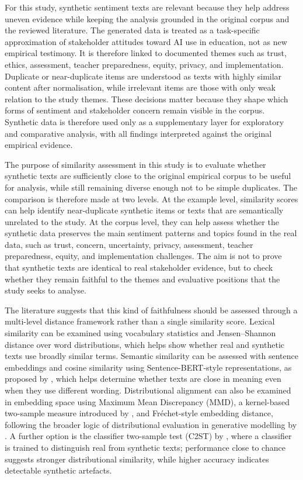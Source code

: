 For this study, synthetic sentiment texts are relevant because they help address
uneven evidence while keeping the analysis grounded in the original corpus and the
reviewed literature. The generated data is treated as a task-specific approximation
of stakeholder attitudes toward AI use in education, not as new empirical testimony.
It is therefore linked to documented themes such as trust, ethics, assessment,
teacher preparedness, equity, privacy, and implementation. Duplicate or
near-duplicate items are understood as texts with highly similar content after
normalisation, while irrelevant items are those with only weak relation to the study
themes. These decisions matter because they shape which forms of sentiment and
stakeholder concern remain visible in the corpus. Synthetic data is therefore used
only as a supplementary layer for exploratory and comparative analysis, with all
findings interpreted against the original empirical evidence.

The purpose of similarity assessment in this study is to evaluate whether synthetic
texts are sufficiently close to the original empirical corpus to be useful for
analysis, while still remaining diverse enough not to be simple duplicates. The
comparison is therefore made at two levels. At the example level, similarity scores
can help identify near-duplicate synthetic items or texts that are semantically
unrelated to the study. At the corpus level, they can help assess whether the
synthetic data preserves the main sentiment patterns and topics found in the real
data, such as trust, concern, uncertainty, privacy, assessment, teacher preparedness,
equity, and implementation challenges. The aim is not to prove that synthetic texts
are identical to real stakeholder evidence, but to check whether they remain faithful
to the themes and evaluative positions that the study seeks to analyse.

The literature suggests that this kind of faithfulness should be assessed through a
multi-level distance framework rather than a single similarity score. Lexical
similarity can be examined using vocabulary statistics and Jensen--Shannon distance
over word distributions, which helps show whether real and synthetic texts use
broadly similar terms. Semantic similarity can be assessed with sentence embeddings
and cosine similarity using Sentence-BERT-style representations, as proposed by
\cite{reimers2019sentence}, which helps determine whether texts are close in meaning
even when they use different wording. Distributional alignment can also be examined
in embedding space using Maximum Mean Discrepancy (MMD), a kernel-based two-sample
measure introduced by \cite{gretton2012kernel}, and Fréchet-style embedding distance,
following the broader logic of distributional evaluation in generative modelling by
\cite{heusel2017gans}. A further option is the classifier two-sample test (C2ST) by
\cite{lopez2016revisiting}, where a classifier is trained to distinguish real from
synthetic texts; performance close to chance suggests stronger distributional
similarity, while higher accuracy indicates detectable synthetic artefacts.


